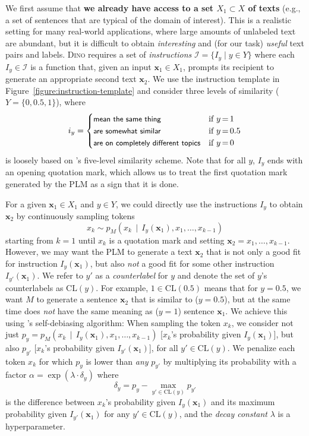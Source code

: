 \documentclass[11pt]{article}
\newcommand\ours{\textsc{Dino}}
\newcommand\given{\,{\mid}\,}
\begin{document}
We first assume that \textbf{we already have access to a set
$X_1 \subset X$ of texts} (e.g., a set of sentences that are
typical of the domain of interest).
This is a realistic setting for many real-world
applications, where large amounts of unlabeled text are
abundant, but it is difficult to obtain \emph{interesting}
and (for our task) \emph{useful}
text pairs and labels. \ours{} requires a set
of \emph{instructions} $\mathcal{I} = \{I_y \mid y \in Y \}$
where each $I_y \in \mathcal{I}$ is a function that, given
an input $\mathbf{x}_1 \in X_1$, prompts its recipient to
generate an appropriate second text $\mathbf{x}_2$. We use
the instruction template in Figure~\ref{figure:instruction-template} and consider three levels of similarity ($Y = \{0, 0.5, 1 \}$), where
\begin{align*}
i_y = \begin{cases} \text{\sffamily\small mean the same thing} & \text{if } y\,{=}\,1\\
\text{\sffamily\small are somewhat similar} & \text{if } y\,{=}\,0.5\\
\text{\sffamily\small are on completely different topics} & \text{if } y\,{=}\,0
\end{cases}
\end{align*}
is loosely based on \citet{cer-etal-2017-semeval}'s
five-level similarity scheme. Note that for all $y$, $I_y$
ends with an opening quotation mark, which
allows us to treat the 
first
quotation mark generated by the PLM as a sign that it
is done.


For a given $\mathbf{x}_1 \in X_1$ and $y \in Y$, we could
directly use the  instructions
$I_y$
to obtain $\mathbf{x}_2$ by continuously sampling tokens
\[
x_k \sim p_M( x_k \given I_y(\mathbf{x}_1), x_1, \ldots, x_{k-1})
\]
starting from $k=1$ until $x_k$ is a quotation mark and
setting $\mathbf{x}_2 = x_1, \ldots, x_{k-1}$. However, we
may want the PLM to generate a text $\mathbf{x}_2$ that is
not only a good fit for instruction $I_y(\mathbf{x}_1)$, but
also
\emph{not} a good fit for some other
instruction $I_{y'}(\mathbf{x}_1)$. We refer to
$y'$ as a \emph{counterlabel} for $y$
and denote the set of $y$'s counterlabels  as
$\text{CL}(y)$. For example, $1 \in \text{CL}(0.5)$ means that
for $y = 0.5$, we want $M$ to generate a sentence
$\mathbf{x}_2$ that is similar to ($y = 0.5$), but at
the same time does \emph{not}
have the same meaning as ($y= 1$) sentence
$\mathbf{x}_1$. We achieve this using
\citet{schick2021selfdiagnosis}'s self-debiasing algorithm:
When sampling the token $x_k$, we consider not just $p_y =
p_M( x_k \given I_y(\mathbf{x}_1), x_1, \ldots, x_{k-1})$
[$x_k$'s  probability given $I_y(\mathbf{x}_1)$], but also
$p_{y'}$ [$x_k$'s probability given $I_{y'}(\mathbf{x}_1)$], for all $y' \in \text{CL}(y)$. We penalize each token $x_k$ for which $p_y$ is lower than \emph{any} $p_{y'}$ by multiplying its probability with a factor
$\alpha = \exp(\lambda \cdot \delta_y)
$ where 
\[
\delta_y = p_y - \max_{y' \in \text{CL}(y)} p_{y'}
\] is the difference between $x_k$'s probability given $I_y(\mathbf{x}_1)$ and its maximum probability given $I_{y'}(\mathbf{x}_1)$ for any $y' \in \text{CL}(y)$, and the \emph{decay constant} $\lambda$ is a hyperparameter.
\end{document}
